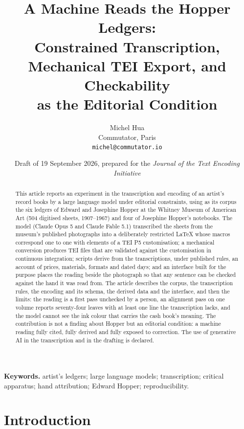 \documentclass[11pt]{article}
\title{\Large A Machine Reads the Hopper Ledgers:\\ Constrained Transcription, Mechanical TEI Export, and Checkability\\ as the Editorial Condition}
\author{Michel Hua\\ \small Commutator, Paris\\ \small \texttt{michel@commutator.io}}
\date{\small Draft of 19 September 2026, prepared for the \emph{Journal of the Text Encoding Initiative}}
\begin{document}
\maketitle

\begin{abstract}
\noindent This article reports an experiment in the transcription and encoding of an artist's record books by a large language model under editorial constraints, using as its corpus the six ledgers of Edward and Josephine Hopper at the Whitney Museum of American Art (504 digitised sheets, 1907--1967) and four of Josephine Hopper's notebooks. The model (Claude Opus 5 and Claude Fable 5.1) transcribed the sheets from the museum's published photographs into a deliberately restricted LaTeX whose macros correspond one to one with elements of a TEI P5 customisation; a mechanical conversion produces TEI files that are validated against the customisation in continuous integration; scripts derive from the transcriptions, under published rules, an account of prices, materials, formats and dated days; and an interface built for the purpose places the reading beside the photograph so that any sentence can be checked against the hand it was read from. The article describes the corpus, the transcription rules, the encoding and its schema, the derived data and the interface, and then the limits: the reading is a first pass unchecked by a person, an alignment pass on one volume reports seventy-four leaves with at least one line the transcription lacks, and the model cannot see the ink colour that carries the cash book's meaning. The contribution is not a finding about Hopper but an editorial condition: a machine reading fully cited, fully derived and fully exposed to correction. The use of generative AI in the transcription and in the drafting is declared.
\end{abstract}

\noindent\textbf{Keywords.} artist's ledgers; large language models; transcription; critical apparatus; hand attribution; Edward Hopper; reproducibility.

\section{Introduction}
\end{document}
